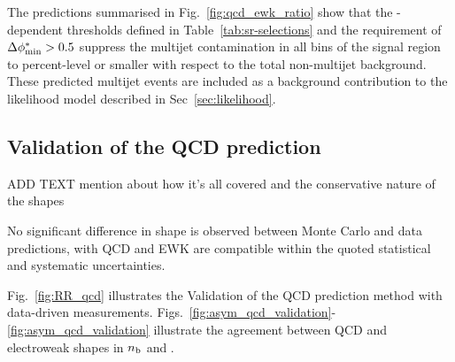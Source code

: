 
The predictions summarised in Fig.~\ref{fig:qcd_ewk_ratio} show that 
the \HT-dependent \alphat thresholds defined in Table~\ref{tab:sr-selections} 
and the requirement of $\mbox{$\Delta\phi^{*}_{\rm min}$} > 0.5$ suppress the multijet
contamination in all bins of the signal region to percent-level or smaller with
respect to the total non-multijet background. These predicted multijet events are 
included as a background contribution to the likelihood model
described in Sec~\ref{sec:likelihood}.


\subsection{Validation of the QCD prediction}
\label{sec:qcdValidation}

ADD TEXT
mention about how it's all covered and the conservative nature of the
shapes

No significant difference in shape is observed between Monte Carlo and data predictions, 
with QCD and EWK are compatible within the quoted statistical and systematic uncertainties.

Fig.~\ref{fig:RR_qcd} illustrates the Validation of the QCD prediction method with data-driven measurements. Figs.~\ref{fig:asym_qcd_validation}-\ref{fig:asym_qcd_validation} illustrate the agreement between QCD and electroweak shapes in $n_{\text{b}}$ and \mht.

